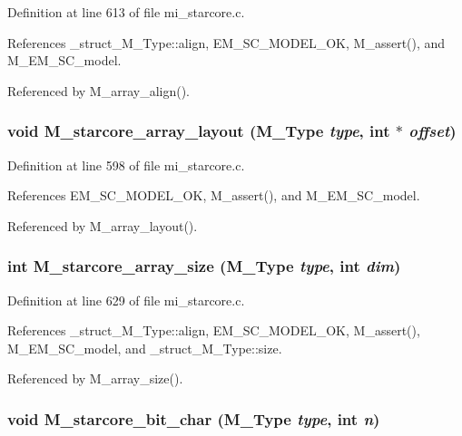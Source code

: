 Definition at line 613 of file mi\_\-starcore.c.

References \_\-struct\_\-M\_\-Type::align, EM\_\-SC\_\-MODEL\_\-OK, M\_\-assert(), and M\_\-EM\_\-SC\_\-model.

Referenced by M\_\-array\_\-align().
\subsubsection{\setlength{\rightskip}{0pt plus 5cm}void M\_\-starcore\_\-array\_\-layout (\bf{M\_\-Type} {\em type}, int $\ast$ {\em offset})}\label{mi__starcore_8c_3ce7e6b6efff6a735ab856796b2670f1}




Definition at line 598 of file mi\_\-starcore.c.

References EM\_\-SC\_\-MODEL\_\-OK, M\_\-assert(), and M\_\-EM\_\-SC\_\-model.

Referenced by M\_\-array\_\-layout().
\subsubsection{\setlength{\rightskip}{0pt plus 5cm}int M\_\-starcore\_\-array\_\-size (\bf{M\_\-Type} {\em type}, int {\em dim})}\label{mi__starcore_8c_82940fc9b64fa00d5d88d473228c9f4e}




Definition at line 629 of file mi\_\-starcore.c.

References \_\-struct\_\-M\_\-Type::align, EM\_\-SC\_\-MODEL\_\-OK, M\_\-assert(), M\_\-EM\_\-SC\_\-model, and \_\-struct\_\-M\_\-Type::size.

Referenced by M\_\-array\_\-size().
\subsubsection{\setlength{\rightskip}{0pt plus 5cm}void M\_\-starcore\_\-bit\_\-char (\bf{M\_\-Type} {\em type}, int {\em n})}\label{mi__starcore_8c_ce008e1194ce9bb3d125e6ec2db74fbd}




